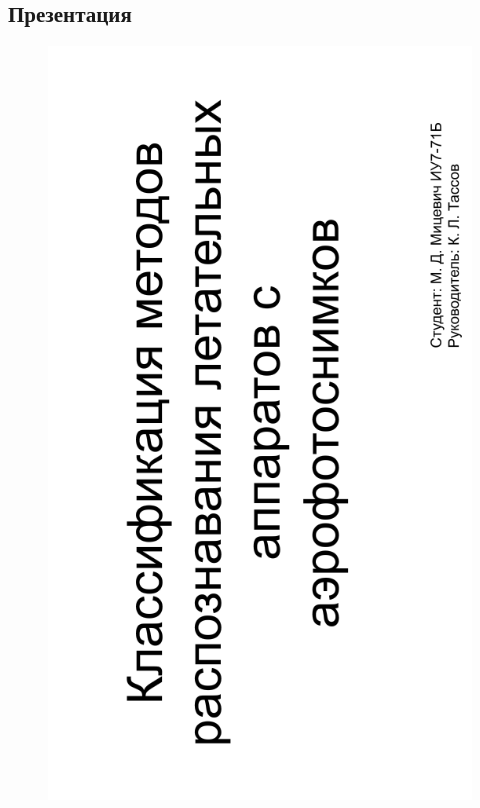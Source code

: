 \begin{appendices}
	\chapter{Презентация}

\end{appendices}

	\begin{figure}[H]
	\begin{center}
		\includegraphics[scale=0.7]{inc/img/slide1.png}
	\end{center}
\end{figure}
